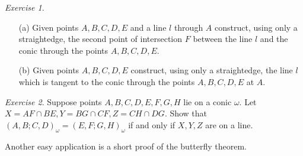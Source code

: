 \documentclass[letterpaper,11pt]{article}
\theoremstyle{definition}
\theoremstyle{remark}
\newtheorem{exer}{Exercise}
\begin{document}
\begin{exer}\label{conicline}
\begin{itemize}
\item[(a)] Given points $A,B,C,D,E$ and a line $l$ through $A$ construct, using only a straightedge, the second point of intersection $F$ between the line $l$ and the conic through the points $A,B,C,D,E$.

\item[(b)] Given points $A,B,C,D,E$ construct, using only a straightedge, the line $l$ which is tangent to the conic through the points $A,B,C,D,E$ at $A$.
\end{itemize}
\end{exer}

\begin{exer} Suppose points $A,B,C,D,E,F,G,H$ lie on a conic $\omega$. Let $X = AF\cap BE, Y = BG\cap CF, Z = CH\cap DG$. Show that $(A,B;C,D)_\omega = (E,F;G,H)_\omega$ if and only if $X,Y,Z$ are on a line.
\end{exer}

Another easy application is a short proof of the butterfly theorem.
\end{document}
